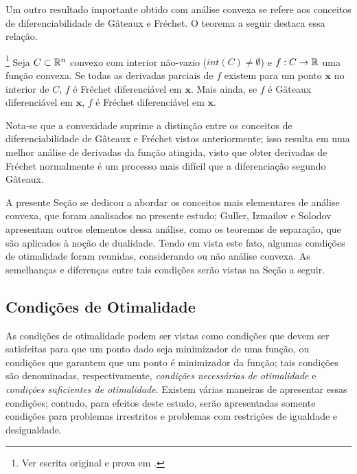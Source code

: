 Um outro resultado importante obtido com an\'{a}lise convexa se refere aos conceitos de diferenciabilidade de G\^{a}teaux e Fr\'{e}chet. O teorema a seguir destaca essa rela\c{c}\~{a}o.

\begin{theorem}\footnote{Ver escrita original e prova em \cite[p. 101]{guller}.}
Seja $C \subset \mathbb{R}^{n}$ convexo com interior n\~{a}o-vazio ($int(C) \ne \emptyset$) e $f: C \to \mathbb{R}$ uma fun\c{c}\~{a}o convexa. Se todas as derivadas parciais de $f$ existem para um ponto $\mathbf{x}$ no interior de $C$, $f$ \'{e} Fr\'{e}chet diferenci\'{a}vel em $\mathbf{x}$. Mais ainda, se $f$ \'{e} G\^{a}teaux diferenci\'{a}vel em $\mathbf{x}$, $f$ \'{e} Fr\'{e}chet diferenci\'{a}vel em $\mathbf{x}$.
\end{theorem}

Nota-se que a convexidade suprime a distin\c{c}\~{a}o entre os conceitos de diferenciabilidade de G\^{a}teaux e Fr\'{e}chet vistos anteriormente; isso resulta em uma melhor an\'{a}lise de derivadas da fun\c{c}\~{a}o atingida, visto que obter derivadas de Fr\'{e}chet normalmente \'{e} um processo mais dif\'{i}cil que a diferencia\c{c}\~{a}o segundo G\^{a}teaux.

A presente Se\c{c}\~{a}o se dedicou a abordar os conceitos mais elementares de an\'{a}lise convexa, que foram analisados no presente estudo; Guller, Izmailov e Solodov apresentam outros elementos dessa an\'{a}lise, como os teoremas de separa\c{c}\~{a}o, que s\~{a}o aplicados \`{a} no\c{c}\~{a}o de dualidade. Tendo em vista este fato, algumas condi\c{c}\~{o}es de otimalidade foram reunidas, considerando ou n\~{a}o an\'{a}lise convexa. As semelhan\c{c}as e diferen\c{c}as entre tais condi\c{c}\~{o}es ser\~{a}o vistas na Se\c{c}\~{a}o a seguir.


\subsection{Condi\c{c}\~{o}es de Otimalidade}

As condi\c{c}\~{o}es de otimalidade podem ser vistas como condi\c{c}\~{o}es que devem ser satisfeitas para que um ponto dado seja minimizador de uma fun\c{c}\~{a}o, ou condi\c{c}\~{o}es que garantem que um ponto \'{e} minimizador da fun\c{c}\~{a}o; tais condi\c{c}\~{o}es s\~{a}o denominadas, respectivamente, \textit{condi\c{c}\~{o}es necess\'{a}rias de otimalidade} e \textit{condi\c{c}\~{o}es suficientes de otimalidade}. Existem v\'{a}rias maneiras de apresentar essas condi\c{c}\~{o}es; contudo, para efeitos deste estudo, ser\~{a}o apresentadas somente condi\c{c}\~{o}es para problemas irrestritos e problemas com restri\c{c}\~{o}es de igualdade e desigualdade.

